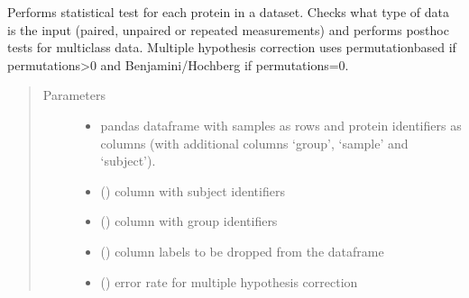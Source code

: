 \documentclass[letterpaper,10pt,english]{sphinxmanual}
\begin{document}
\begin{fulllineitems}
\label{\detokenize{_autosummary/analytics_core.analytics:analytics_core.analytics.analytics.run_anova}}
Performs statistical test for each protein in a dataset.
Checks what type of data is the input (paired, unpaired or repeated measurements) and performs posthoc tests for multiclass data.
Multiple hypothesis correction uses permutation\sphinxhyphen{}based if permutations\textgreater{}0 and Benjamini/Hochberg if permutations=0.
\begin{quote}\begin{description}
\item[{Parameters}] \leavevmode\begin{itemize}
\item {} 
 \textendash{} pandas dataframe with samples as rows and protein identifiers as columns (with additional columns ‘group’, ‘sample’ and ‘subject’).

\item {} 
 () \textendash{} column with subject identifiers

\item {} 
 () \textendash{} column with group identifiers

\item {} 
 () \textendash{} column labels to be dropped from the dataframe

\item {} 
 () \textendash{} error rate for multiple hypothesis correction


\end{itemize}
\end{description}
\end{quote}
\end{fulllineitems}
\end{document}
